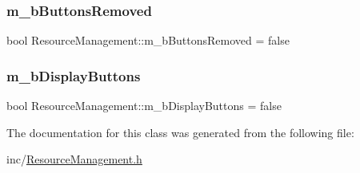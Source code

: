 \subsubsection{\texorpdfstring{m\+\_\+b\+Buttons\+Removed}{m\_bButtonsRemoved}}
{\footnotesize\ttfamily bool Resource\+Management\+::m\+\_\+b\+Buttons\+Removed = false}

\mbox{\label{class_resource_management_a44e194185578f2b0c63bea0e0a444b57}} 
\subsubsection{\texorpdfstring{m\+\_\+b\+Display\+Buttons}{m\_bDisplayButtons}}
{\footnotesize\ttfamily bool Resource\+Management\+::m\+\_\+b\+Display\+Buttons = false}



The documentation for this class was generated from the following file\+:\begin{DoxyCompactItemize}
\item 
inc/\mbox{\hyperlink{_resource_management_8h}{Resource\+Management.\+h}}\end{DoxyCompactItemize}

